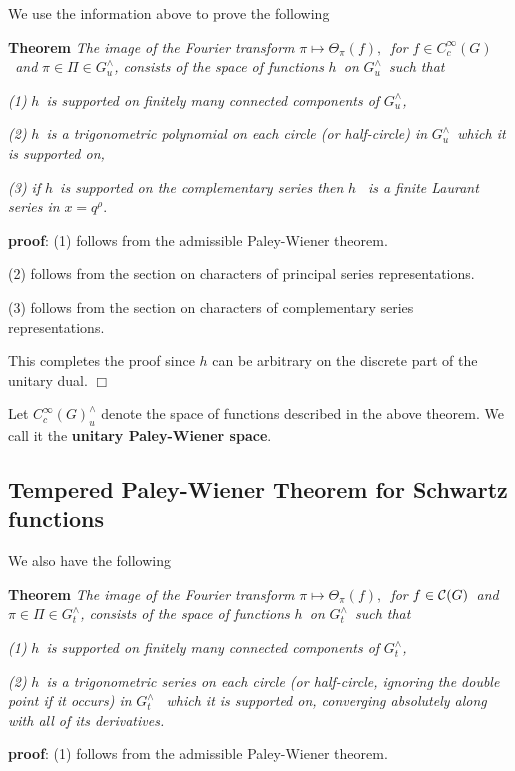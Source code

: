 We use the information above to prove the following

{\bf Theorem} {\em The image of the Fourier transform }$\pi \longmapsto
\Theta _\pi (f),${\em \ for }$f\in C_c^\infty (G)${\em \ and }$\pi \in \Pi
\in G_u^{\wedge }${\em , consists of the space of functions }$h${\em \ on }$%
G_u^{\wedge }${\em \ such that}

{\em (1) }$h${\em \ is supported on finitely many connected components of }$%
G_u^{\wedge }${\em ,}

{\em (2) }$h${\em \ is a trigonometric polynomial on each circle (or
half-circle) in }$G_u^{\wedge }${\em \ which it is supported on,}

{\em (3) if }$h${\em \ is supported on the complementary series then }$h$%
{\em \ is a finite Laurant series in }$x=q^\rho .$

{\bf proof}: (1) follows from the admissible Paley-Wiener theorem.

(2) follows from the section on characters of principal series
representations.

(3) follows from the section on characters of complementary series
representations.

This completes the proof since $h$ can be arbitrary on the discrete part of
the unitary dual. $\Box $

Let $C_c^\infty (G)_u^{\wedge }$ denote the space of functions described in
the above theorem. We call it the {\bf unitary Paley-Wiener space}.

\subsection{Tempered Paley-Wiener Theorem for Schwartz functions}

We also have the following

{\bf Theorem} {\em The image of the Fourier transform }$\pi \longmapsto
\Theta _\pi (f),${\em \ for }$f\in {\cal C}(G)${\em \ and }$\pi \in \Pi \in
G_t^{\wedge }${\em , consists of the space of functions }$h${\em \ on }$%
G_t^{\wedge }${\em \ such that}

{\em (1) }$h${\em \ is supported on finitely many connected components of }$%
G_t^{\wedge }${\em ,}

{\em (2) }$h${\em \ is a trigonometric series on each circle (or
half-circle, ignoring the double point if it occurs) in }$G_t^{\wedge }${\em %
\ which it is supported on, converging absolutely along with all of its
derivatives.}

{\bf proof}: (1) follows from the admissible Paley-Wiener theorem.

